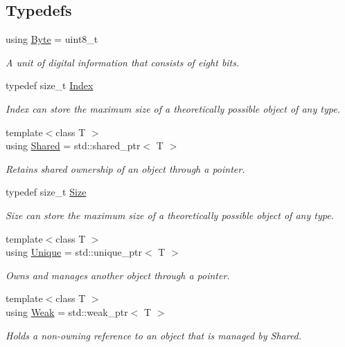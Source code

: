 \subsection*{Typedefs}
\begin{DoxyCompactItemize}
\item 
using \hyperlink{namespacelibrary_1_1core_1_1types_ae37635b89098069fb3b8c5181edd0945}{Byte} = uint8\+\_\+t
\begin{DoxyCompactList}\small\item\em A unit of digital information that consists of eight bits. \end{DoxyCompactList}\item 
typedef size\+\_\+t \hyperlink{namespacelibrary_1_1core_1_1types_ad87eeb821d7067ec94e06ed1980d6350}{Index}
\begin{DoxyCompactList}\small\item\em Index can store the maximum size of a theoretically possible object of any type. \end{DoxyCompactList}\item 
{\footnotesize template$<$class T $>$ }\\using \hyperlink{namespacelibrary_1_1core_1_1types_a3dae1a00f899bac0366794fa85eda8ee}{Shared} = std\+::shared\+\_\+ptr$<$ T $>$
\begin{DoxyCompactList}\small\item\em Retains shared ownership of an object through a pointer. \end{DoxyCompactList}\item 
typedef size\+\_\+t \hyperlink{namespacelibrary_1_1core_1_1types_a701626ea1027888ebbb8cfd0ff7adab0}{Size}
\begin{DoxyCompactList}\small\item\em Size can store the maximum size of a theoretically possible object of any type. \end{DoxyCompactList}\item 
{\footnotesize template$<$class T $>$ }\\using \hyperlink{namespacelibrary_1_1core_1_1types_ac12d38691838fbc9a36765ee62ace52a}{Unique} = std\+::unique\+\_\+ptr$<$ T $>$
\begin{DoxyCompactList}\small\item\em Owns and manages another object through a pointer. \end{DoxyCompactList}\item 
{\footnotesize template$<$class T $>$ }\\using \hyperlink{namespacelibrary_1_1core_1_1types_a26c13c272f9fba4ce17ee4980be6703c}{Weak} = std\+::weak\+\_\+ptr$<$ T $>$
\begin{DoxyCompactList}\small\item\em Holds a non-\/owning reference to an object that is managed by Shared. \end{DoxyCompactList}\end{DoxyCompactItemize}
